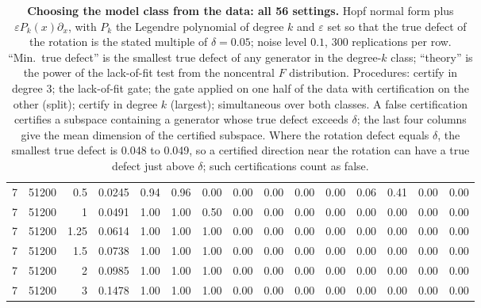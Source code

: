 \begin{table}[!htbp]
\begin{adjustbox}{max width=\textwidth, max totalheight=0.74\textheight}
\begin{tabular}{rrrrrrrrrrrrrrr}
7 & 51200 & 0.5 & 0.0245 & 0.94 & 0.96 & 0.00 & 0.00 & 0.00 & 0.00 & 0.00 & 0.06 & 0.41 & 0.00 & 0.00 \\
7 & 51200 & 1 & 0.0491 & 1.00 & 1.00 & 0.50 & 0.00 & 0.00 & 0.00 & 0.00 & 0.00 & 0.00 & 0.00 & 0.00 \\
7 & 51200 & 1.25 & 0.0614 & 1.00 & 1.00 & 1.00 & 0.00 & 0.00 & 0.00 & 0.00 & 0.00 & 0.00 & 0.00 & 0.00 \\
7 & 51200 & 1.5 & 0.0738 & 1.00 & 1.00 & 1.00 & 0.00 & 0.00 & 0.00 & 0.00 & 0.00 & 0.00 & 0.00 & 0.00 \\
7 & 51200 & 2 & 0.0985 & 1.00 & 1.00 & 1.00 & 0.00 & 0.00 & 0.00 & 0.00 & 0.00 & 0.00 & 0.00 & 0.00 \\
7 & 51200 & 3 & 0.1478 & 1.00 & 1.00 & 1.00 & 0.00 & 0.00 & 0.00 & 0.00 & 0.00 & 0.00 & 0.00 & 0.00 \\
\bottomrule
\end{tabular}
\end{adjustbox}
\caption{\textbf{Choosing the model class from the data: all 56 settings.} Hopf normal form plus $\varepsilon P_k(x)\partial_x$, with $P_k$ the Legendre polynomial of degree $k$ and $\varepsilon$ set so that the true defect of the rotation is the stated multiple of $\delta = 0.05$; noise level $0.1$, 300 replications per row. ``Min.\ true defect'' is the smallest true defect of any generator in the degree-$k$ class; ``theory'' is the power of the lack-of-fit test from the noncentral $F$ distribution. Procedures: certify in degree 3; the lack-of-fit gate; the gate applied on one half of the data with certification on the other (split); certify in degree $k$ (largest); simultaneous over both classes. A false certification certifies a subspace containing a generator whose true defect exceeds $\delta$; the last four columns give the mean dimension of the certified subspace. Where the rotation defect equals $\delta$, the smallest true defect is 0.048 to 0.049, so a certified direction near the rotation can have a true defect just above $\delta$; such certifications count as false.}
\label{stab:selection}
\end{table}
